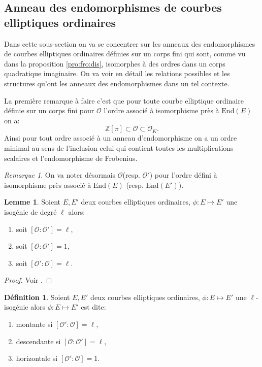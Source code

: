 \documentclass[10pt,a4paper]{book}
\theoremstyle{plain}
\theoremstyle{definition}
\theoremstyle{definition}
\newtheorem{lem}[thm]{Lemme}
\theoremstyle{definition}
\theoremstyle{definition}
\theoremstyle{definition}
\newtheorem{defi}[thm]{Définition}
\theoremstyle{remark}
\newtheorem{rem}[thm]{Remarque}
\theoremstyle{remark}
\theoremstyle{definition}
\begin{document}
\subsection{Anneau des endomorphismes de courbes elliptiques ordinaires}
Dans cette sous-section on va se concentrer sur les anneaux des endomorphismes de courbes elliptiques ordinaires définies sur un corps fini qui sont, comme vu dans la proposition \ref{pro:fro:dis}, isomorphes à des ordres dans un corps quadratique imaginaire. On va voir en détail les relations possibles et les structures qu'ont les anneaux des endomorphismes dans un tel contexte.

La première remarque à faire c'est que pour toute courbe elliptique ordinaire définie sur un corps fini pour $\mathcal{O}$ l'ordre associé à isomorphisme près à $\mathrm{End}(E)$ on a: 
\[
\mathbb{Z}[\pi] \subset \mathcal{O} \subset \mathcal{O}_K.
\]
Ainsi pour tout ordre associé à un anneau d'endomorphisme on a un ordre minimal
au sens de l'inclusion celui qui contient toutes les multiplications scalaires 
et l'endomorphisme de Frobenius.

\begin{rem}
On va noter désormais $\mathcal{O}$(resp. $\mathcal{O}'$) pour l'ordre défini à isomorphisme près associé à $\mathrm{End}(E)$ (resp. $\mathrm{End}(E')$).
\end{rem}

\begin{lem}
Soient $E,E'$ deux courbes elliptiques ordinaires, $\phi: E \mapsto E'$ une isogénie de degré $\ell$ alors:
\begin{enumerate}
\item soit $[\mathcal{O} : \mathcal{O'}]=\ell$, 
\item soit $[\mathcal{O} : \mathcal{O'}]=1$,
\item soit $[\mathcal{O'} : \mathcal{O}]=\ell$.
\end{enumerate}
\end{lem}

\begin{proof}
Voir \cite[Proposition 21]{Kohel96}.
\end{proof}

\begin{defi}
\label{def:iso:nom}
Soient $E,E'$ deux courbes elliptiques ordinaires, $\phi: E \mapsto E'$ une $\ell$-isogénie alors $\phi: E \mapsto E'$ est dite:
\begin{enumerate}
\item montante si $[\mathcal{O'} : \mathcal{O}]=\ell$,
\item descendante si $[\mathcal{O} : \mathcal{O'}]=\ell$,
\item horizontale si $[\mathcal{O'} : \mathcal{O}]=1$.
\end{enumerate}
\end{defi}
\end{document}
